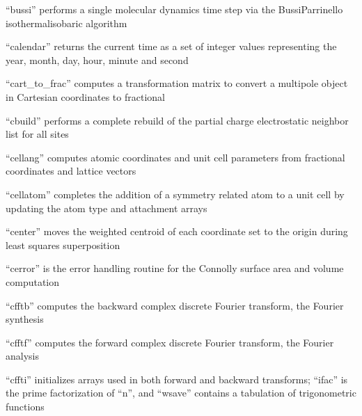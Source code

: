 \documentclass[letterpaper,11pt,english]{sphinxmanual}
\begin{document}

“bussi” performs a single molecular dynamics time step via
the Bussi\sphinxhyphen{}Parrinello isothermal\sphinxhyphen{}isobaric algorithm


“calendar” returns the current time as a set of integer values
representing the year, month, day, hour, minute and second


“cart\_to\_frac” computes a transformation matrix to convert
a multipole object in Cartesian coordinates to fractional


“cbuild” performs a complete rebuild of the partial charge
electrostatic neighbor list for all sites


“cellang” computes atomic coordinates and unit cell parameters
from fractional coordinates and lattice vectors


“cellatom” completes the addition of a symmetry related atom
to a unit cell by updating the atom type and attachment arrays


“center” moves the weighted centroid of each coordinate
set to the origin during least squares superposition


“cerror” is the error handling routine for the Connolly
surface area and volume computation


“cfftb” computes the backward complex discrete Fourier
transform, the Fourier synthesis



“cfftf” computes the forward complex discrete Fourier
transform, the Fourier analysis



“cffti” initializes arrays used in both forward and backward
transforms; “ifac” is the prime factorization of “n”, and
“wsave” contains a tabulation of trigonometric functions
\end{document}
